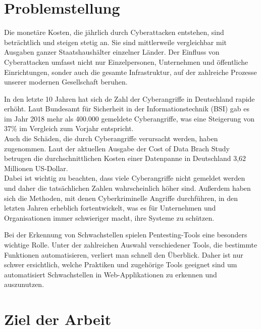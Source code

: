 \section{Problemstellung}

Die monetäre Kosten, die jährlich durch Cyberattacken entstehen, sind beträchtlich und steigen stetig an. Sie sind mittlerweile vergleichbar mit Ausgaben ganzer Staatshaushälter einzelner Länder. Der Einfluss von Cyberattacken umfasst nicht nur Einzelpersonen, Unternehmen und öffentliche Einrichtungen, sonder auch die gesamte Infrastruktur, auf der zahlreiche Prozesse unserer modernen Gesellschaft beruhen.

In den letzte 10 Jahren hat sich de Zahl der Cyberangriffe in Deutschland rapide erhöht. Laut Bundesamt für Sicherheit in der Informationstechnik (BSI) gab es im Jahr 2018 mehr als 400.000 gemeldete Cyberangriffe, was eine Steigerung von 37\% im Vergleich zum Vorjahr entspricht. \cite{1} \\
Auch die Schäden, die durch Cyberangriffe verursacht werden, haben zugenommen. Laut der aktuellen Ausgabe der Cost of Data Brach Study betrugen die durchschnittlichen Kosten einer Datenpanne in Deutschland 3,62 Millionen US-Dollar. \cite{2} \\
Dabei ist wichtig zu beachten, dass viele Cyberangriffe nicht gemeldet werden und daher die tatsächlichen Zahlen wahrscheinlich höher sind. Außerdem haben sich die Methoden, mit denen Cyberkriminelle Angriffe durchführen, in den letzten Jahren erheblich fortentwickelt, was es für Unternehmen und Organisationen immer schwieriger macht, ihre Systeme zu schützen.

Bei der Erkennung von Schwachstellen spielen Pentesting-Tools eine besonders wichtige Rolle. Unter der zahlreichen Auswahl verschiedener Tools, die bestimmte Funktionen automatisieren, verliert man schnell den Überblick. Daher ist nur schwer ersichtlich, welche Praktiken und zugehörige Tools geeignet sind um automatisiert Schwachstellen in Web-Applikationen zu erkennen und auszunutzen. 




\section{Ziel der Arbeit}

